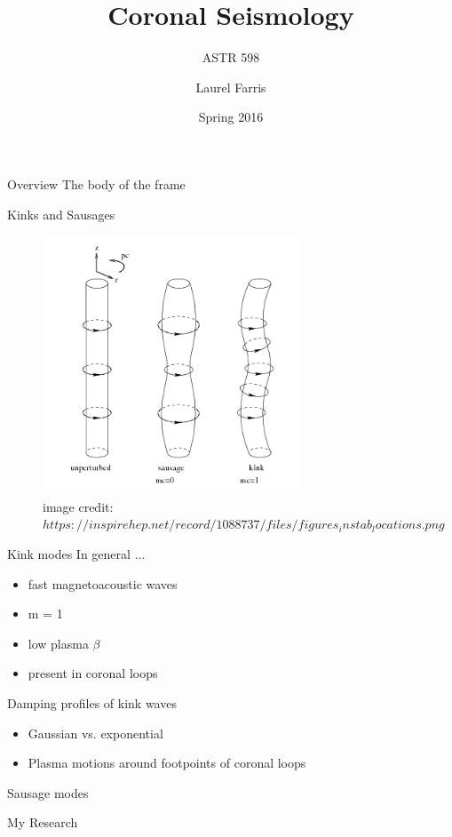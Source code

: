 \documentclass{beamer}
\title{Coronal Seismology}
\subtitle{ASTR 598}
\date{Spring 2016}
\author{Laurel Farris}
\begin{document}
\begin{frame}
    \titlepage
\end{frame}

\begin{frame}{Overview}
    The body of the frame
\end{frame}

\begin{frame}{Kinks and Sausages}
    \begin{figure}
        \includegraphics[width=3in]{kink_saus.png}
    \caption*{\tiny image credit:
    $https://inspirehep.net/record/1088737/files/figures_instab_locations.png$}
    \end{figure}
\end{frame}

\begin{frame}{Kink modes}
    In general $\ldots$
    \begin{itemize}
        \item fast magnetoacoustic waves
        \item m = 1
        \item low plasma $\beta$
        \item present in coronal loops
    \end{itemize}
\end{frame}

\begin{frame}{Damping profiles of kink waves}
    \begin{itemize}
        \item Gaussian vs. exponential
        \item Plasma motions around footpoints of coronal loops
    \end{itemize}
\end{frame}

\begin{frame}{Sausage modes}
\end{frame}

\begin{frame}{My Research}
\end{frame}
\end{document}
